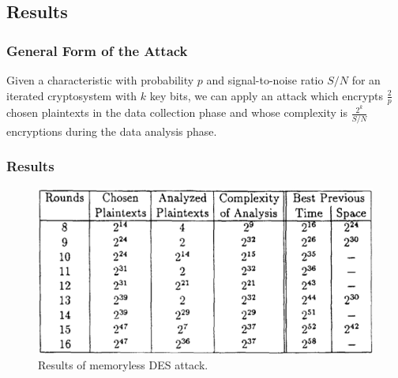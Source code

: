 \documentclass{beamer}
\begin{document}
    \subsection{Results}
    \label{subsec:results}

    \begin{frame}
        \frametitle{General Form of the Attack}
        \begin{theorem}
        \label{thm:gen-attack}    
        Given a characteristic with probability \(p\) and signal-to-noise ratio
        \(S/N\) for an iterated cryptosystem with \(k\) key bits, we can apply
        an attack which encrypts \(\frac{2}{p}\) chosen plaintexts in the data
        collection phase and whose complexity is \(\frac{2^k}{S/N}\) encryptions
        during the data analysis phase.
        \end{theorem}
        
    \end{frame}

    \begin{frame}
        \frametitle{Results}
        \begin{figure}[!ht]
            \centering
            \includegraphics[width=0.7\linewidth]{images/summary_new.png}
            \caption{Results of memoryless DES attack.}
            \label{fig:des-new-summary}
        \end{figure}
    \end{frame}
\end{document}
